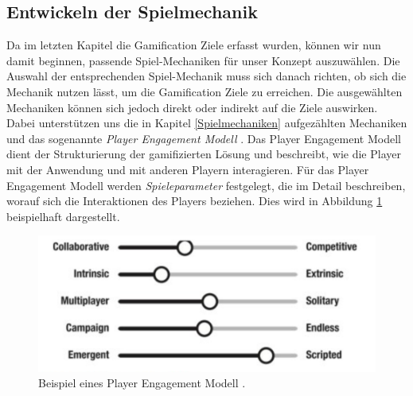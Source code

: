 \documentclass[a4paper,12pt,twoside]{scrartcl}
\begin{document}
\subsection{Entwickeln der Spielmechanik}
Da im letzten Kapitel die Gamification Ziele erfasst wurden, können wir nun damit beginnen, passende Spiel-Mechaniken für unser Konzept auszuwählen. Die Auswahl der entsprechenden Spiel-Mechanik muss sich danach richten, ob sich die Mechanik nutzen lässt, um die Gamification Ziele zu erreichen. Die ausgewählten Mechaniken können sich jedoch direkt oder indirekt auf die Ziele auswirken. Dabei unterstützen uns die in Kapitel \ref{Spielmechaniken} aufgezählten Mechaniken und das sogenannte \textit{Player Engagement Modell} \cite{gamificationDefinition}. Das Player Engagement Modell dient der Strukturierung der gamifizierten Lösung und beschreibt, wie die Player mit der Anwendung und mit anderen Playern interagieren. Für das Player Engagement Modell werden \textit{Spieleparameter} festgelegt, die im Detail beschreiben, worauf sich die Interaktionen des Players beziehen. Dies wird in Abbildung \ref{PlayerEngagementModel} beispielhaft dargestellt.
\\
\begin{figure}[h!]
\begin{center}
\includegraphics[scale = 0.4]{Bilder/PlayerEngagementModel.png}
\caption{Beispiel eines Player Engagement Modell \cite{gamificationDefinition}.}
\label{PlayerEngagementModel}
\end{center}
\end{figure}
\end{document}
